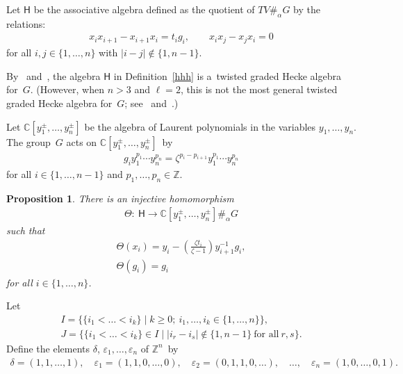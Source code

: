 \documentclass[11pt]{article}
\numberwithin{equation}{section}
\newtheorem{Proposition}[Theorem]{Proposition}
{\theoremstyle{definition}
\newtheorem{Definition}[Theorem]{Definition}
\newtheorem{Example}[Theorem]{Example}
\newtheorem{Remark}[Theorem]{Remark}
\newtheorem{Notation}[Theorem]{Notation}
}
\begin{document}
\begin{Definition}
\label{hhh}
Let $\mathsf{H}$ be the associative algebra def\/ined as the quotient of $TV\#_\alpha G$ by the relations:
\begin{gather*}
x_ix_{i+1}- x_{i+1} x_i = t_i g_i,
\qquad
x_ix_j - x_jx_i = 0
\end{gather*}
for all $i, j \in \{1,\ldots,n\}$ with $|i-j|\notin\{1, n-1\}$.
\end{Definition}

\begin{Remark}
By~\cite[Theorem 2.10]{W} and~\cite[Example 2.16]{W}, the algebra $\mathsf{H}$ in Def\/inition~\ref{hhh} is a~twisted
graded Hecke algebra for~$G$.
(However, when $n>3$ and $\ell=2$, this is not the most general twisted graded Hecke algebra for~$G$; see~\cite[Example 2.16]{W}
and~\cite[Example 5.1]{W2}.)
\end{Remark}

Let ${\mathbb{C}}[y_1^\pm, \ldots, y_n^\pm]$ be the algebra of Laurent polynomials in the variables $y_1,\ldots, y_n$.
The group~$G$ acts on ${\mathbb{C}}[y_1^\pm, \ldots, y_n^\pm]$~by
\begin{gather*}
g_i y_1^{p_1}\cdots y_n^{p_n} = \zeta^{p_i-p_{i+1}}y_1^{p_1}\cdots y_n^{p_n}
\end{gather*}
for all $i\in\{1,\ldots, n-1\}$ and $p_1,\ldots,p_n\in {\mathbb{Z}}$.

\begin{Proposition}
\label{T1}
There is an injective homomorphism
\begin{gather*}
\Theta: \ \mathsf{H} \longrightarrow {\mathbb{C}}[y_1^\pm, \ldots, y_n^\pm]\#_\alpha G
\end{gather*}
such that
\begin{gather}
\Theta(x_i) = y_i - \left(\frac{\zeta t_i}{\zeta-1} \right) y_{i+1}^{-1}g_i,
\label{theta1}
\\
\Theta(g_i) = g_i
\label{theta3}
\end{gather}
for all $i\in\{1,\ldots, n\}$.
\end{Proposition}

Let
\begin{gather*}
I = \{\{i_1<\dots<i_k\} \mid k\ge 0; \ i_1,\ldots, i_k\in \{1,\dots,n\} \},
\\
J = \{\{i_1<\dots<i_k\}\in I \mid |i_r-i_s|\notin\{1,n-1\}\ \text{for all}\ r, s \}.
\end{gather*}
Def\/ine the elements $\delta$, $\varepsilon_1, \ldots, \varepsilon_n$ of ${\mathbb{Z}}^n$~by
\begin{gather*}
\delta = (1,1,\dots,1),
\quad
\varepsilon_1 = (1,1,0,\dots,0),
\quad
\varepsilon_2 = (0,1,1,0,\dots),
\quad
\ldots,
\quad
\varepsilon_n = (1,0,\dots,0,1).
\end{gather*}
\end{document}
